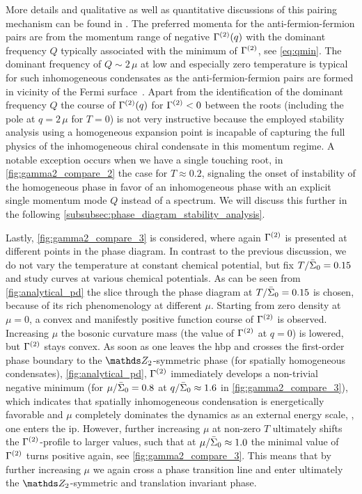 More details and qualitative as well as quantitative discussions of this pairing mechanism can be found in .
The preferred momenta for the anti-fermion-fermion pairs are from the momentum range of negative $\Gamma^{(2)}(q)$ with the dominant frequency $Q$ typically associated with the minimum of $\Gamma^{(2)}$, see \cref{eq:qmin}.
The dominant frequency of $Q\sim 2\,\mu$ at low and especially zero temperature is typical for such inhomogeneous condensates as the anti-fermion-fermion pairs are formed in vicinity of the Fermi surface~\cite{Kojo:2009ha,Kojo:2011cn,Buballa:2014tba}.
Apart from the identification of the dominant frequency $Q$ the course of $\Gamma^{(2)}(q)$ for $\Gamma^{(2)}<0$ between the roots (including the pole at ${q=2\,\mu}$ for ${T=0}$) is not very instructive because the employed stability analysis using a homogeneous expansion point is incapable of capturing the full physics of the inhomogeneous chiral condensate in this momentum regime.
A notable exception occurs when we have a single touching root, in \cref{fig:gamma2_compare_2} the case for $T\approx0.2$, signaling the onset of instability of the homogeneous phase in favor of an inhomogeneous phase with an explicit single momentum mode $Q$ instead of a spectrum.
We will discuss this further in the following \cref{subsubsec:phase_diagram_stability_analysis}.\bigskip

Lastly, \cref{fig:gamma2_compare_3} is considered, where again $\Gamma^{(2)}$ is presented at different points in the phase diagram.
In contrast to the previous discussion, we do not vary the temperature at constant chemical potential, but fix ${T/\bar{\Sigma}_0 = 0.15}$ and study curves at various chemical potentials.
As can be seen from \cref{fig:analytical_pd} the slice through the phase diagram at ${T/\bar{\Sigma}_0 = 0.15}$ is chosen, because of its rich phenomenology at different $\mu$.
Starting from zero density at ${\mu = 0}$, a convex and manifestly positive function course of $\Gamma^{(2)}$ is observed.
Increasing $\mu$ the bosonic curvature mass (the value of $\Gamma^{(2)}$ at ${q = 0}$) is lowered, but $\Gamma^{(2)}$ stays convex.
As soon as one leaves the \gls{hbp} and crosses the first-order phase boundary to the $\Z_2$-symmetric phase (for spatially homogeneous condensates), \cf{}  \cref{fig:analytical_pd}, $\Gamma^{(2)}$ immediately develops a non-trivial negative minimum (for ${\mu/\bar{\Sigma}_0 = 0.8}$ at $q/\bar{\Sigma}_0 \approx 1.6$ in \cref{fig:gamma2_compare_3}), which indicates that spatially inhomogeneous condensation is energetically favorable and $\mu$ completely dominates the dynamics as an external energy scale, \ie{}, one enters the \gls{ip}.
However, further increasing $\mu$ at non-zero $T$ ultimately shifts the $\Gamma^{(2)}$-profile to larger values, such that at $\mu/\bar{\Sigma}_0 \approx 1.0$ the minimal value of $\Gamma^{(2)}$ turns positive again, see \cref{fig:gamma2_compare_3}.
This means that by further increasing $\mu$ we again cross a phase transition line and enter ultimately the $\Z_2$-symmetric and translation invariant phase.

